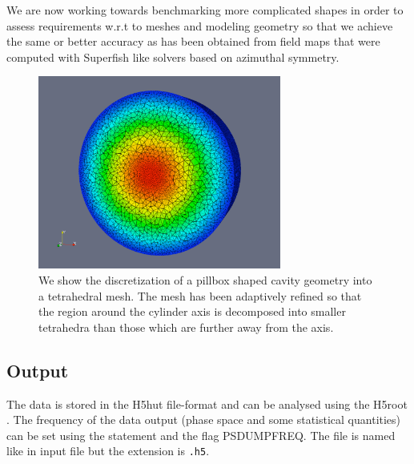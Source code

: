 We are now working towards benchmarking more complicated shapes in order to
assess requirements w.r.t to meshes and modeling geometry so that we
achieve the same or better accuracy as has been obtained from field
maps that were computed with Superfish like solvers based on azimuthal symmetry.

\begin{figure}
  \begin{center}
  \includegraphics[origin=bl,width=80mm,angle=0]{./figures/adaptivePillboxMesh.pdf}
  \caption[Tetrahedral mesh of a pillbox shaped cavity]{\label{figure_pillbox_adaptively_refined_mesh}
    We show the discretization of a pillbox shaped cavity geometry
        into a tetrahedral mesh. The mesh has been adaptively
        refined so that the region around the cylinder axis is
        decomposed into smaller tetrahedra than those which are
        further away from the axis.
  }
  \end{center}
%
\end{figure}

\clearpage
\subsection{Output}
The data is stored in the H5hut file-format \cite{bib:howison2010} and can be analysed
using the H5root \cite{bib:schietinger}. The frequency
of the data output (phase space and some statistical quantities) can be set using the %
statement and the flag PSDUMPFREQ. The file is named like in input file but the extension is {\tt .h5}.


